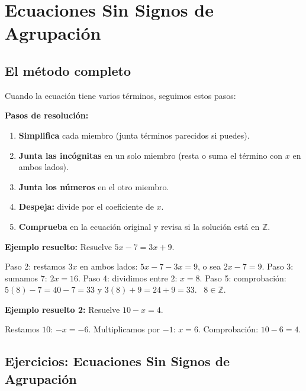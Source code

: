 \documentclass[12pt, letterpaper]{article}
\newcommand{\Z}{\mathbb{Z}}
\begin{document}
\section{Ecuaciones Sin Signos de Agrupación}

\subsection{El método completo}

Cuando la ecuación tiene varios términos, seguimos estos pasos:

\begin{cuadroteoria}
  \textbf{Pasos de resolución:}
  \begin{enumerate}
    \item \textbf{Simplifica} cada miembro (junta términos parecidos si puedes).
    \item \textbf{Junta las incógnitas} en un solo miembro (resta o suma el término con $x$ en ambos lados).
    \item \textbf{Junta los números} en el otro miembro.
    \item \textbf{Despeja:} divide por el coeficiente de $x$.
    \item \textbf{Comprueba} en la ecuación original y revisa si la solución está en $\Z$.
  \end{enumerate}
\end{cuadroteoria}

\noindent\textbf{Ejemplo resuelto:} Resuelve $5x - 7 = 3x + 9$.

Paso 2: restamos $3x$ en ambos lados: $5x - 7 - 3x = 9$, o sea $2x - 7 = 9$.
Paso 3: sumamos $7$: $2x = 16$.
Paso 4: dividimos entre $2$: $x = 8$.
Paso 5: comprobación: $5(8) - 7 = 40 - 7 = 33$ y $3(8) + 9 = 24 + 9 = 33$. \checkmark\ $8 \in \Z$.

\noindent\textbf{Ejemplo resuelto 2:} Resuelve $10 - x = 4$.

Restamos $10$: $-x = -6$. Multiplicamos por $-1$: $x = 6$. Comprobación: $10 - 6 = 4$. \checkmark

\subsection{Ejercicios: Ecuaciones Sin Signos de Agrupación}
\end{document}
